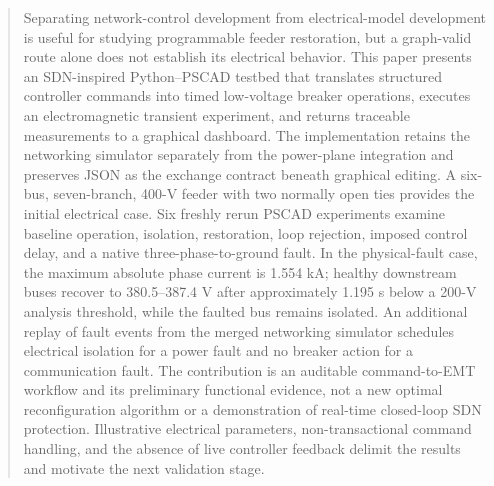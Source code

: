 \begin{abstract}
Separating network-control development from electrical-model development is
useful for studying programmable feeder restoration, but a graph-valid route
alone does not establish its electrical behavior. This paper presents an
SDN-inspired Python--PSCAD testbed that translates structured controller
commands into timed low-voltage breaker operations, executes an electromagnetic
transient experiment, and returns traceable measurements to a graphical
dashboard. The implementation retains the networking simulator separately from
the power-plane integration and preserves JSON as the exchange contract beneath
graphical editing. A six-bus, seven-branch, 400-V feeder with two normally open
ties provides the initial electrical case. Six freshly rerun
PSCAD experiments examine baseline operation, isolation, restoration, loop
rejection, imposed control delay, and a native three-phase-to-ground fault.
In the physical-fault case, the maximum absolute phase current is 1.554 kA;
healthy downstream buses recover to 380.5--387.4 V after approximately 1.195 s
below a 200-V analysis threshold, while the faulted bus remains isolated.
An additional replay of fault events from the merged networking simulator
schedules electrical isolation for a power fault and no breaker action for a
communication fault. The contribution is an auditable command-to-EMT workflow and its preliminary
functional evidence, not a new optimal reconfiguration algorithm or a
demonstration of real-time closed-loop SDN protection. Illustrative electrical
parameters, non-transactional command handling, and the absence of live
controller feedback delimit the results and motivate the next validation stage.
\end{abstract}
